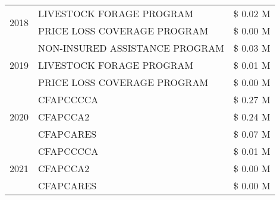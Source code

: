 \begin{tabular}{llr}
\cline{1-3}
\multirow[t]{2}{*}{2018} & LIVESTOCK FORAGE PROGRAM & \$ 0.02 M \\
 & PRICE LOSS COVERAGE PROGRAM & \$ 0.00 M \\
\cline{1-3}
\multirow[t]{3}{*}{2019} & NON-INSURED ASSISTANCE PROGRAM & \$ 0.03 M \\
 & LIVESTOCK FORAGE PROGRAM & \$ 0.01 M \\
 & PRICE LOSS COVERAGE PROGRAM & \$ 0.00 M \\
\cline{1-3}
\multirow[t]{3}{*}{2020} & CFAPCCCCA & \$ 0.27 M \\
 & CFAPCCA2 & \$ 0.24 M \\
 & CFAPCARES & \$ 0.07 M \\
\cline{1-3}
\multirow[t]{3}{*}{2021} & CFAPCCCCA & \$ 0.01 M \\
 & CFAPCCA2 & \$ 0.00 M \\
 & CFAPCARES & \$ 0.00 M \\
\cline{1-3}
\bottomrule
\end{tabular}
